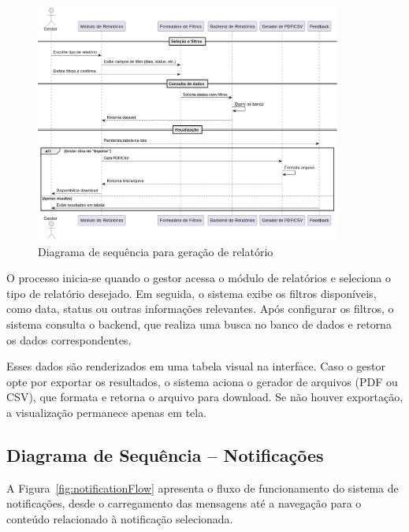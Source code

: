 \begin{figure}[H]
    \centering
    \includegraphics[width=0.9\textwidth]{images/diagramasdesequencias/report.png}
    \caption{Diagrama de sequência para geração de relatório}
    \label{fig:reportGeneration}
\end{figure}

O processo inicia-se quando o gestor acessa o módulo de relatórios e seleciona o tipo de relatório desejado. Em seguida, o sistema exibe os filtros disponíveis, como data, status ou outras informações relevantes. Após configurar os filtros, o sistema consulta o backend, que realiza uma busca no banco de dados e retorna os dados correspondentes.

Esses dados são renderizados em uma tabela visual na interface. Caso o gestor opte por exportar os resultados, o sistema aciona o gerador de arquivos (PDF ou CSV), que formata e retorna o arquivo para download. Se não houver exportação, a visualização permanece apenas em tela.

\subsection{Diagrama de Sequência – Notificações}

A Figura~\ref{fig:notificationFlow} apresenta o fluxo de funcionamento do sistema de notificações, desde o carregamento das mensagens até a navegação para o conteúdo relacionado à notificação selecionada.

